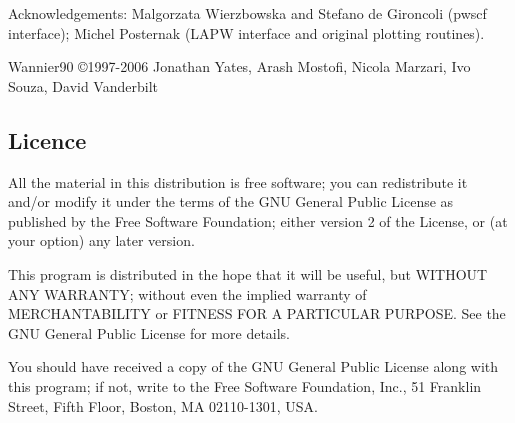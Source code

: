 Acknowledgements: Malgorzata Wierzbowska and Stefano de Gironcoli (pwscf interface);
Michel Posternak (LAPW interface and original plotting routines). 

Wannier90 \copyright 1997-2006 Jonathan Yates, Arash
Mostofi, Nicola Marzari, Ivo Souza, David Vanderbilt      

\subsection{Licence}
All the material in this distribution is free software; you can
redistribute it and/or 
modify it under the terms of the GNU General Public License
as published by the Free Software Foundation; either version 2
of the License, or (at your option) any later version.

This program is distributed in the hope that it will be useful,
but WITHOUT ANY WARRANTY; without even the implied warranty of
MERCHANTABILITY or FITNESS FOR A PARTICULAR PURPOSE.  See the
GNU General Public License for more details.

You should have received a copy of the GNU General Public License
along with this program; if not, write to the Free Software
Foundation, Inc., 51 Franklin Street, Fifth Floor, Boston, MA  02110-1301, USA.


 
